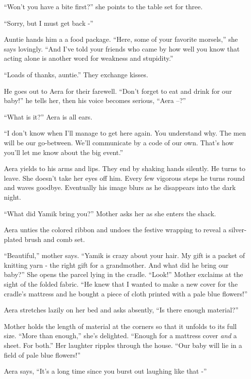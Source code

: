 \documentclass[twoside,11pt]{book}
\begin{document}
``Won't you have a bite first?'' she points to the table set for three.

``Sorry, but I must get back -''

Auntie hands him a a food package. ``Here, some of your favorite morsels,'' she says
lovingly. ``And I've told your friends who came by how well you know that acting alone is another word
for weakness and stupidity.''

``Loads of thanks, auntie.'' They exchange kisses.

He goes out to Aera for their farewell. ``Don't forget to eat and drink for our
baby!'' he tells her, then his voice becomes serious, ``Aera --?''

``What is it?'' Aera is all ears.

``I don't know when I'll manage to get here again. You understand why. The men will be our go-between.
We'll communicate by a code of our own. That's how you'll let me know about the big event.''

Aera yields to his arms and lips. They end by shaking hands silently.  He turns to leave. She doesn't take her eyes off
him. Every few vigorous steps he turns round and waves goodbye. Eventually his image blurs as he disappears into the
dark night.

``What did Yamik bring you?'' Mother asks her as she enters the shack.

Aera unties the colored ribbon and undoes the festive wrapping to reveal a silver-plated brush and comb set.

``Beautiful,'' mother says. ``Yamik is crazy about your hair. My gift is a packet
of knitting yarn - the right gift for a grandmother. And what did he bring our baby?'' She opens the
parcel lying in the cradle. ``Look!'' Mother exclaims at the sight of the folded fabric.
``He knew that I wanted to make a new cover for the cradle's mattress and he bought a piece of cloth
printed with a pale blue flowers!''

Aera stretches lazily on her bed and asks absently, ``Is there enough material?''

Mother holds the length of material at the corners so that it unfolds to its full size. ``More than
enough,'' she's delighted. ``Enough for a mattress cover \textit{and} a sheet. For
both.'' Her laughter ripples through the house. ``Our baby will lie in a field of pale blue
flowers!''

Aera says, ``It's a long time since you burst out laughing like that -''
\end{document}
